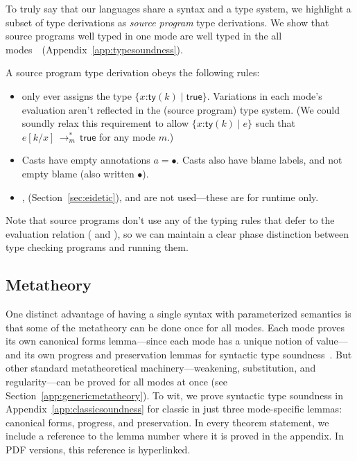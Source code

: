 \documentclass[9pt]{extarticle}
\newcommand{\ottnt}[1]{\mathit{#1}}
\newcommand{\ottsym}[1]{#1}
\begin{document}
To truly say that our languages share a syntax and a type system, we
highlight a subset of type derivations as \textit{source program} type
derivations.  We show that source programs well typed in one mode are
well typed in the all modes\ifpopl~\cite{Greenberg14spacetr}\else~(Appendix~\ref{app:typesoundness})\fi.
\numbertheoremstrue
\begin{definition}
  \label{def:sourceprogram}
A source program type derivation obeys
the following rules:
\begin{itemize}
\item {} only ever assigns the type $ \{ \mathit{x} \mathord{:}  \mathsf{ty} ( \ottnt{k} )  \mathrel{\mid}  \mathsf{true}  \} $.
  Variations in each mode's evaluation aren't reflected in the (source
  program) type system. (We could soundly relax this requirement to
  allow $ \{ \mathit{x} \mathord{:}  \mathsf{ty} ( \ottnt{k} )  \mathrel{\mid} \ottnt{e} \} $ such that $ \ottnt{e}  [  \ottnt{k} / \mathit{x}  ]  \,  \longrightarrow ^{*}_{ \ottnt{m} }  \,  \mathsf{true} $ for any
  mode $\ottnt{m}$.)
\item Casts have empty annotations $\ottnt{a}  \ottsym{=}  \bullet$. Casts also have
  blame labels, and not empty blame (also written $ \bullet $).
\item {},  (Section~\ref{sec:eidetic}), and
   are not used---these are for runtime only.
\end{itemize}
\end{definition}
\numbertheoremsfalse
Note that source programs don't use any of the typing rules that defer
to the evaluation relation ( and ), so we can
maintain a clear phase distinction between type checking programs and
running them.

\subsection{Metatheory}
\label{sec:metatheory}

One distinct advantage of having a single syntax with parameterized
semantics is that some of the metatheory can be done once for all
modes.
Each mode proves its own canonical forms lemma---since each mode has a
unique notion of value---and its own progress and preservation lemmas
for syntactic type soundness~\cite{Wright94syntactic}. But other
standard metatheoretical machinery---weakening, substitution, and
regularity---can be proved for all modes at once (see
Section~\ref{app:genericmetatheory}).
To wit, we prove syntactic type soundness in
Appendix~\ref{app:classicsoundness} for classic \lambdah in just three
mode-specific lemmas: canonical forms, progress, and preservation. In
every theorem statement, we include a reference to the lemma number
where it is proved in the appendix. In PDF versions, this reference is
hyperlinked.
\end{document}
